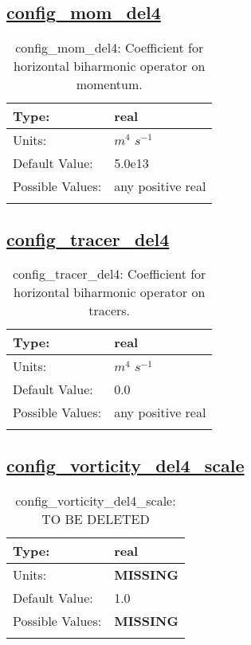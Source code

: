\subsection[config\_mom\_del4]{\hyperref[sec:nm_tab_hmix_del4]{config\_mom\_del4}}
\label{subsec:nm_sec_config_mom_del4}
\begin{center}
\begin{longtable}{| p{2.0in} | p{4.0in} |}
    \hline
    Type: & real \\
    \hline
    Units: & $m^4$ $s^{-1}$ \\
    \hline
    Default Value: & 5.0e13 \\
    \hline
    Possible Values: & any positive real \\
    \hline
    \caption{config\_mom\_del4: Coefficient for horizontal biharmonic operator on momentum.}
\end{longtable}
\end{center}
\subsection[config\_tracer\_del4]{\hyperref[sec:nm_tab_hmix_del4]{config\_tracer\_del4}}
\label{subsec:nm_sec_config_tracer_del4}
\begin{center}
\begin{longtable}{| p{2.0in} | p{4.0in} |}
    \hline
    Type: & real \\
    \hline
    Units: & $m^4$ $s^{-1}$ \\
    \hline
    Default Value: & 0.0 \\
    \hline
    Possible Values: & any positive real \\
    \hline
    \caption{config\_tracer\_del4: Coefficient for horizontal biharmonic operator on tracers.}
\end{longtable}
\end{center}
\subsection[config\_vorticity\_del4\_scale]{\hyperref[sec:nm_tab_hmix_del4]{config\_vorticity\_del4\_scale}}
\label{subsec:nm_sec_config_vorticity_del4_scale}
\begin{center}
\begin{longtable}{| p{2.0in} | p{4.0in} |}
    \hline
    Type: & real \\
    \hline
    Units: & {\bf \color{red} MISSING} \\
    \hline
    Default Value: & 1.0 \\
    \hline
    Possible Values: & {\bf \color{red} MISSING} \\
    \hline
    \caption{config\_vorticity\_del4\_scale: {\color{red} TO BE DELETED}}
\end{longtable}
\end{center}
